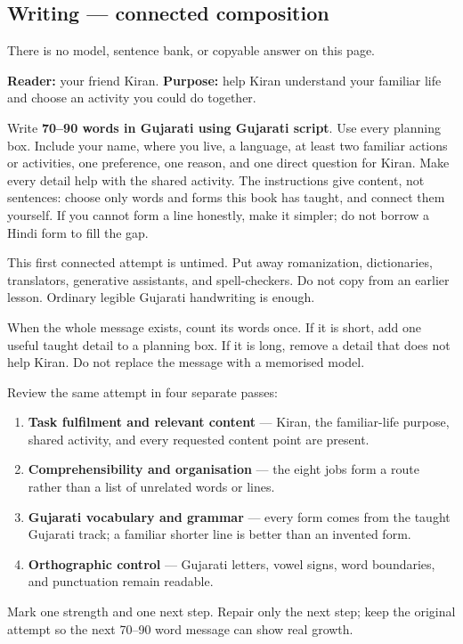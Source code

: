 \subsection*{Writing — connected composition}
There is no model, sentence bank, or copyable answer on this page.

\textbf{Reader:} your friend Kiran. \textbf{Purpose:} help Kiran understand your familiar life and choose an activity you could do together.

Write \textbf{70–90 words in Gujarati using Gujarati script}. Use every planning box. Include your name, where you live, a language, at least two familiar actions or activities, one preference, one reason, and one direct question for Kiran. Make every detail help with the shared activity. The instructions give content, not sentences: choose only words and forms this book has taught, and connect them yourself. If you cannot form a line honestly, make it simpler; do not borrow a Hindi form to fill the gap.

This first connected attempt is untimed. Put away romanization, dictionaries, translators, generative assistants, and spell-checkers. Do not copy from an earlier lesson. Ordinary legible Gujarati handwriting is enough.

When the whole message exists, count its words once. If it is short, add one useful taught detail to a planning box. If it is long, remove a detail that does not help Kiran. Do not replace the message with a memorised model.

\begin{tcolorbox}[breakable,colback=teal!4,colframe=teal!35!black,title={Before you move on}]
Review the same attempt in four separate passes:

\begin{enumerate}
\raggedright
  \item \textbf{Task fulfilment and relevant content} — Kiran, the familiar-life purpose, shared activity, and every requested content point are present.
  \item \textbf{Comprehensibility and organisation} — the eight jobs form a route rather than a list of unrelated words or lines.
  \item \textbf{Gujarati vocabulary and grammar} — every form comes from the taught Gujarati track; a familiar shorter line is better than an invented form.
  \item \textbf{Orthographic control} — Gujarati letters, vowel signs, word boundaries, and punctuation remain readable.
\end{enumerate}

Mark one strength and one next step. Repair only the next step; keep the original attempt so the next 70–90 word message can show real growth.
\end{tcolorbox}
